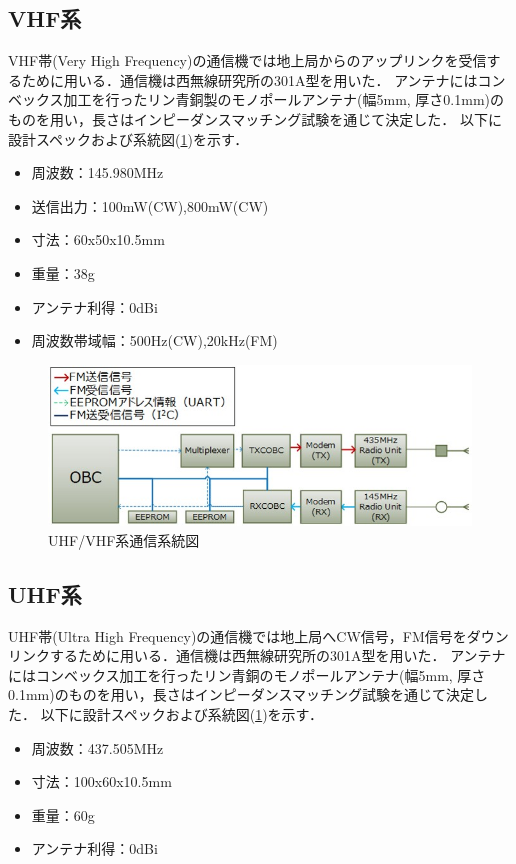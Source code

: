 \subsection{VHF系}
VHF帯(Very High Frequency)の通信機では地上局からのアップリンクを受信するために用いる．通信機は西無線研究所の301A型を用いた．
アンテナにはコンベックス加工を行ったリン青銅製のモノポールアンテナ(幅5mm, 厚さ0.1mm)のものを用い，長さはインピーダンスマッチング試験を通じて決定した．
以下に設計スペックおよび系統図(\ref{fig4-2-3})を示す．
\begin{itemize}
	\item 周波数：145.980MHz
	\item 送信出力：100mW(CW),800mW(CW)
	\item 寸法：60x50x10.5mm
	\item 重量：38g
	\item アンテナ利得：0dBi
	\item 周波数帯域幅：500Hz(CW),20kHz(FM)
\end{itemize}
\begin{figure}[H]
	\centering
	\includegraphics[scale=0.6]{03/fig/4-2-3.jpg}
	\caption{UHF/VHF系通信系統図}
	\label{fig4-2-3}
\end{figure}

\subsection{UHF系}
UHF帯(Ultra High Frequency)の通信機では地上局へCW信号，FM信号をダウンリンクするために用いる．通信機は西無線研究所の301A型を用いた．
アンテナにはコンベックス加工を行ったリン青銅のモノポールアンテナ(幅5mm, 厚さ0.1mm)のものを用い，長さはインピーダンスマッチング試験を通じて決定した．
以下に設計スペックおよび系統図(\ref{fig4-2-3})を示す．
\begin{itemize}
	\item 周波数：437.505MHz
	\item 寸法：100x60x10.5mm
	\item 重量：60g
	\item アンテナ利得：0dBi
\end{itemize}

